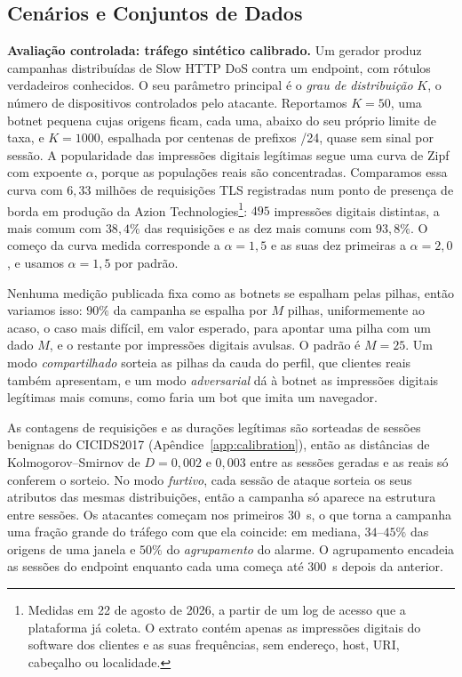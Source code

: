 \documentclass[conference,letterpaper,10pt]{IEEEtran}
\newcommand\1{\textit{(i)}}
\newcommand\2{\textit{(ii)}}
\newcommand\3{\textit{(iii)}}
\begin{document}
\subsection{Cenários e Conjuntos de Dados}

\textbf{Avaliação controlada: tráfego sintético calibrado.} Um gerador produz campanhas distribuídas de Slow HTTP DoS contra um endpoint, com rótulos verdadeiros conhecidos. O seu parâmetro principal é o \textit{grau de distribuição} $K$, o número de dispositivos controlados pelo atacante. Reportamos $K = 50$, uma botnet pequena cujas origens ficam, cada uma, abaixo do seu próprio limite de taxa, e $K = 1000$, espalhada por centenas de prefixos /24, quase sem sinal por sessão. A popularidade das impressões digitais legítimas segue uma curva de Zipf com expoente $\alpha$, porque as populações reais são concentradas. Comparamos essa curva com $6{,}33$ milhões de requisições TLS registradas num ponto de presença de borda em produção da Azion Technologies\footnote{Medidas em 22 de agosto de 2026, a partir de um log de acesso que a plataforma já coleta. O extrato contém apenas as impressões digitais do software dos clientes e as suas frequências, sem endereço, host, URI, cabeçalho ou localidade.}: $495$ impressões digitais distintas, a mais comum com $38{,}4\%$ das requisições e as dez mais comuns com $93{,}8\%$. O começo da curva medida corresponde a $\alpha = 1{,}5$ e as suas dez primeiras a $\alpha = 2{,}0$, e usamos $\alpha = 1{,}5$ por padrão.

Nenhuma medição publicada fixa como as botnets se espalham pelas pilhas, então variamos isso: $90\%$ da campanha se espalha por $M$ pilhas, uniformemente ao acaso, o caso mais difícil, em valor esperado, para apontar uma pilha com um dado $M$, e o restante por impressões digitais avulsas. O padrão é $M = 25$. Um modo \textit{compartilhado} sorteia as pilhas da cauda do perfil, que clientes reais também apresentam, e um modo \textit{adversarial} dá à botnet as impressões digitais legítimas mais comuns, como faria um bot que imita um navegador.

As contagens de requisições e as durações legítimas são sorteadas de sessões benignas do CICIDS2017 (Apêndice~\ref{app:calibration}), então as distâncias de Kolmogorov--Smirnov de $D = 0{,}002$ e $0{,}003$ entre as sessões geradas e as reais só conferem o sorteio. No modo \textit{furtivo}, cada sessão de ataque sorteia os seus atributos das mesmas distribuições, então a campanha só aparece na estrutura entre sessões. Os atacantes começam nos primeiros 30~s, o que torna a campanha uma fração grande do tráfego com que ela coincide: em mediana, $34$--$45\%$ das origens de uma janela e $50\%$ do \textit{agrupamento} do alarme. O agrupamento encadeia as sessões do endpoint enquanto cada uma começa até 300~s depois da anterior.
\end{document}
